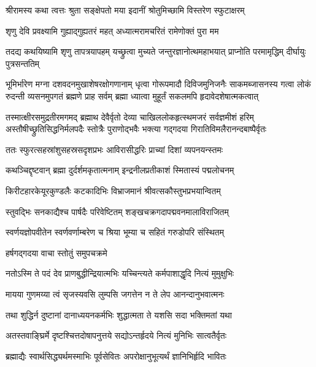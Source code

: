 \twolineshloka
{श्रीरामस्य कथा त्वत्तः श्रुता सङ्क्षेपतो मया}
{इदानीं श्रोतुमिच्छामि विस्तरेण स्फुटाक्षरम्} %


\twolineshloka
{शृणु देवि प्रवक्ष्यामि गुह्याद्गुह्यतरं महत्}
{अध्यात्मरामचरितं रामेणोक्तं पुरा मम} %

\threelineshloka
{तदद्य कथयिष्यामि शृणु तापत्रयापहम्}
{यच्छ्रुत्वा मुच्यते जन्तुरज्ञानोत्थमहाभयात्}
{प्राप्नोति परमामृद्धिम् दीर्घायुः पुत्रसन्ततिम्} %

\fourlineindentedshloka
{भूमिर्भारेण मग्ना दशवदनमुखाशेषरक्षोगणानाम्}
{धृत्वा गोरूपमादौ दिविजमुनिजनैः साकमब्जासनस्य}
{गत्वा लोकं रुदन्ती व्यसनमुपगतं ब्रह्मणे प्राह सर्वम्}
{ब्रह्मा ध्यात्वा मुहूर्तं सकलमपि हृदावेदशेषात्मकत्वात्} %

\fourlineindentedshloka
{तस्मात्क्षीरसमुद्रतीरमगमद् ब्रह्माथ देवैर्वृतो}
{देव्या चाखिललोकहृत्स्थमजरं सर्वज्ञमीशं हरिम्}
{अस्तौषीच्छ्रुतिसिद्धनिर्मलपदैः स्तोत्रैः पुराणोद्भवैः}
{भक्त्या गद्गदया गिरातिविमलैरानन्दबाष्पैर्वृतः} %

\twolineshloka
{ततः स्फुरत्सहस्रांशुसहस्रसदृशप्रभः}
{आविरासीद्धरिः प्राच्यां दिशां व्यपनयन्स्तमः} %

\twolineshloka
{कथञ्चिद्दृष्टवान् ब्रह्मा दुर्दर्शमकृतात्मनाम्}
{इन्द्रनीलप्रतीकाशं स्मितास्यं पद्मलोचनम्} %

\twolineshloka
{किरीटहारकेयूरकुण्डलैः कटकादिभिः}
{विभ्राजमानं श्रीवत्सकौस्तुभप्रभयान्वितम्} %

\twolineshloka
{स्तुवद्भिः सनकाद्यैश्च पार्षदैः परिवेष्टितम्}
{शङ्खचक्रगदापद्मवनमालाविराजितम्} %

\twolineshloka
{स्वर्णयज्ञोपवीतेन स्वर्णवर्णाम्बरेण च}
{श्रिया भूम्या च सहितं गरुडोपरि संस्थितम्} %

\onelineshloka
{हर्षगद्गदया वाचा स्तोतुं समुपचक्रमे} %


\twolineshloka
{नतोऽस्मि ते पदं देव प्राणबुद्धीन्द्रियात्मभिः}
{यच्चिन्त्यते कर्मपाशाद्धृदि नित्यं मुमुक्षुभिः} %

\twolineshloka
{मायया गुणमय्या त्वं सृजस्यवसि लुम्पसि}
{जगत्तेन न ते लेप आनन्दानुभवात्मनः} %

\twolineshloka
{तथा शुद्धिर्न दुष्टानां दानाध्ययनकर्मभिः}
{शुद्धात्मता ते यशसि सदा भक्तिमतां यथा} %

\twolineshloka
{अतस्तवाङ्घ्रिर्मे दृष्टश्चित्तदोषापनुत्तये}
{सद्योऽन्तर्हृदये नित्यं मुनिभिः सात्वतैर्वृतः} %

\twolineshloka
{ब्रह्माद्यैः स्वार्थसिद्ध्यर्थमस्माभिः पूर्वसेवितः}
{अपरोक्षानुभूत्यर्थं ज्ञानिभिर्हृदि भावितः} %

